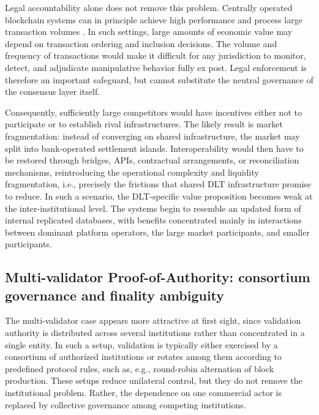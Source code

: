 \documentclass[
reprint,
showkeys,
superscriptaddress,
aps,
pra,
longbibliography,
nofootinbib,
]{revtex4-2}
\theoremstyle{definition}\newtheorem{definition}{Definition}
\begin{document}
Legal accountability alone does not remove this problem.
Centrally operated blockchain systems can in principle achieve high performance and process large transaction volumes \cite{lovejoy2023hamilton,lovejoy2023parsec}.
In such settings, large amounts of economic value may depend on transaction ordering and inclusion decisions.
The volume and frequency of transactions would make it difficult for any jurisdiction to monitor, detect, and adjudicate manipulative behavior fully ex post.
Legal enforcement is therefore an important safeguard, but cannot substitute the neutral governance of the consensus layer itself.



Consequently, sufficiently large competitors would have incentives either not to participate or to establish rival infrastructures. 
The likely result is market fragmentation: instead of converging on shared infrastructure, the market may split into bank-operated settlement islands. Interoperability would then have to be restored through bridges, APIs, contractual arrangements, or reconciliation mechanisms, reintroducing the operational complexity and liquidity fragmentation, i.e., precisely the frictions that shared DLT infrastructure promise to reduce.
In such a scenario, the DLT-specific value proposition becomes weak at the inter-institutional level.
The systems begin to resemble an updated form of internal replicated databases, with benefits concentrated mainly in interactions between dominant platform operators, the large market participants, and smaller participants.


\subsection{Multi-validator Proof-of-Authority: consortium governance and finality ambiguity}

The multi-validator case appears more attractive at first sight, since validation authority is distributed across several institutions rather than concentrated in a single entity.
In such a setup, validation is typically either exercised by a consortium of authorized institutions or rotates among them according to predefined protocol rules, such as, e.g., round-robin alternation of block production.
These setups reduce unilateral control, but they do not remove the institutional problem.
Rather, the dependence on one commercial actor is replaced by collective governance among competing institutions.%
\end{document}
